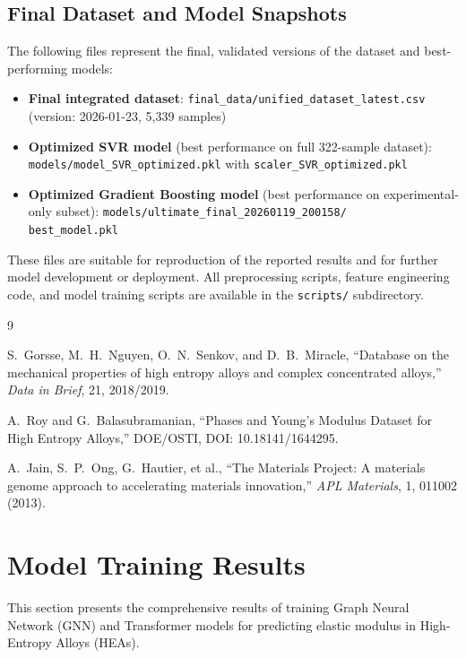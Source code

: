 \documentclass[11pt,a4paper]{article}
\begin{document}
\subsection*{Final Dataset and Model Snapshots}

The following files represent the final, validated versions of the dataset and best-performing models:

\begin{itemize}
  \item \textbf{Final integrated dataset}: \texttt{final\_data/unified\_dataset\_latest.csv} (version: 2026-01-23, 5{,}339 samples)
  \item \textbf{Optimized SVR model} (best performance on full 322-sample dataset): \texttt{models/model\_SVR\_optimized.pkl} with \texttt{scaler\_SVR\_optimized.pkl}
  \item \textbf{Optimized Gradient Boosting model} (best performance on experimental-only subset): \texttt{models/ultimate\_final\_20260119\_200158/}\\\texttt{best\_model.pkl}
\end{itemize}

These files are suitable for reproduction of the reported results and for further model development or deployment. All preprocessing scripts, feature engineering code, and model training scripts are available in the \texttt{scripts/} subdirectory.

\begin{thebibliography}{9}

S.~Gorsse, M.~H.~Nguyen, O.~N.~Senkov, and D.~B.~Miracle,
``Database on the mechanical properties of high entropy alloys and complex concentrated alloys,'' \emph{Data in Brief}, 21, 2018/2019.

A.~Roy and G.~Balasubramanian,
``Phases and Young's Modulus Dataset for High Entropy Alloys,'' DOE/OSTI, DOI: 10.18141/1644295.

A.~Jain, S.~P.~Ong, G.~Hautier, et al.,
``The Materials Project: A materials genome approach to accelerating materials innovation,'' \emph{APL Materials}, 1, 011002 (2013).

\end{thebibliography}

\section{Model Training Results}

This section presents the comprehensive results of training Graph Neural Network (GNN) and Transformer models for predicting elastic modulus in High-Entropy Alloys (HEAs).
\end{document}
